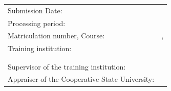 \begin{titlepage}
\begin{center}
	\vfill
	\begin{tabular}{ll}
		Submission Date:                               & \abgabe \\[0.2cm]
		Processing period:                             & \bearbeitungszeitraum \\[0.2cm]
		Matriculation number, Course:                  & \matrikelnr , \kurs \\[0.2cm]
		Training institution:                          & \firmaName \\
		                                               & \firmaStrasse \\
		                                               & \firmaPlz \\[0.2cm]
		Supervisor of the training institution:        & \betreuerFirma \\[0.2cm]
		Appraiser of the Cooperative State University: & \betreuerDhbw \\[2cm]
	\end{tabular} 
\end{center}
\end{titlepage}
